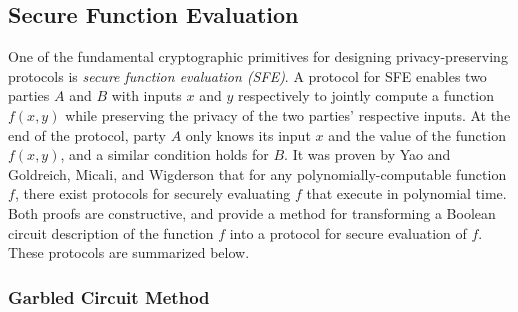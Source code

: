 \subsection{Secure Function Evaluation}

One of the fundamental cryptographic primitives for designing privacy-preserving
protocols is \textit{secure function evaluation (SFE)}. A protocol
for SFE enables two parties $A$ and $B$ with inputs $x$ and $y$
respectively to jointly compute a function $f(x,y)$ while preserving
the privacy of the two parties' respective inputs. At the end of the
protocol, party $A$ only knows its input $x$ and the value of the
function $f(x,y)$, and a similar condition holds for $B$. It was
proven by Yao \cite{Yao86} and Goldreich, Micali, and Wigderson \cite{GMW87}
that for any polynomially-computable function $f$, there exist protocols
for securely evaluating $f$ that execute in polynomial time. Both
proofs are constructive, and provide a method for transforming a Boolean
circuit description of the function $f$ into a protocol for secure
evaluation of $f$. These protocols are summarized below.


\subsubsection{Garbled Circuit Method \label{sub:Garbled-Circuit-Method}}

